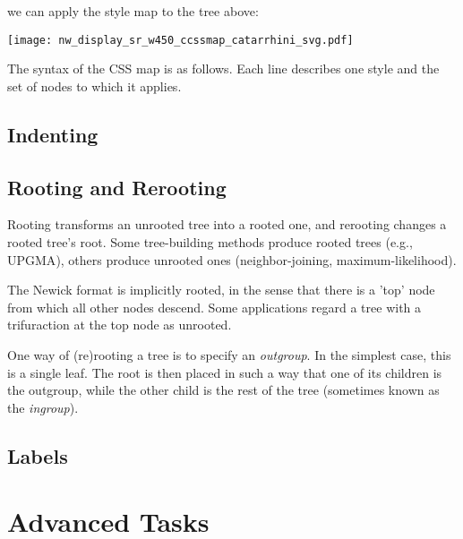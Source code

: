 \documentclass[a4paper,10pt]{report}
\newcommand{\css}{\textsc{CSS}}
\begin{document}
we can apply the style map to the tree above:



\begin{center}
 \texttt{[image: nw\_display\_sr\_w450\_ccssmap\_catarrhini\_svg.pdf]}
\end{center}

The syntax of the \css{} map is as follows. Each line describes one style and the set of nodes to which it applies.

\section{Indenting}
\label{sct_indent}

\section{Rooting and Rerooting}
\label{sct_reroot}

Rooting transforms an unrooted tree into a rooted one, and rerooting changes a rooted tree's root. Some tree-building methods produce rooted trees (e.g., \textsc{UPGMA}), others produce unrooted ones (neighbor-joining, maximum-likelihood). 

The Newick format is implicitly rooted, in the sense that there is a 'top' node from which all other nodes descend. Some applications regard a tree with a trifuraction at the top node as unrooted. 

One way of (re)rooting a tree is to specify an \textit{outgroup}. In the simplest case, this is a single leaf. The root is then placed in such a way that one of its children is the outgroup, while the other child is the rest of the tree (sometimes known as the \textit{ingroup}).

\section{Labels}

\chapter{Advanced Tasks}
\label{chap_adv}
\end{document}

